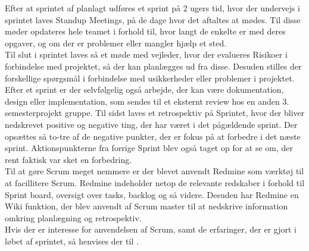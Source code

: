 \documentclass[Rapport/Rapport_main.tex]{subfiles}
\begin{document}
Efter at sprintet af planlagt udføres et sprint på 2 ugers tid, hvor der undervejs i sprintet laves Standup Meetings, på de dage hvor det aftaltes at mødes. Til disse møder opdateres hele teamet i forhold til, hvor langt de enkelte er med deres opgaver, og om der er problemer eller mangler hjælp et sted.\\
Til slut i sprintet laves så et møde med vejleder, hvor der evalueres Risikoer i forbindelse med projektet, så der kan planlægges ud fra disse. Desuden stilles der forskellige spørgsmål i forbindelse med usikkerheder eller problemer i projektet. Efter et sprint er der selvfølgelig også arbejde, der kan være dokumentation, design eller implementation, som sendes til et eksternt review hos en anden 3. semesterprojekt gruppe. Til sidst laves et retrospektiv på Sprintet, hvor der bliver nedskrevet positive og negative ting, der har været i det pågældende sprint. Der opsættes så to-tre af de negative punkter, der er fokus på at forbedre i det næste sprint. Aktionspunkterne fra forrige Sprint blev også taget op for at se om, der rent faktisk var sket en forbedring.\\
Til at gøre Scrum meget nemmere er der blevet anvendt Redmine som værktøj til at facillitere Scrum. Redmine indeholder netop de relevante redskaber i forhold til Sprint board, oversigt over tasks, backlog og så videre. Desuden har Redmine en Wiki funktion, der blev anvendt af Scrum master til at nedskrive information omkring planlægning og retrospektiv.\\
Hvis der er interesse for anvendelsen af Scrum, samt de erfaringer, der er gjort i løbet af sprintet, så henvises der til .
\end{document}
